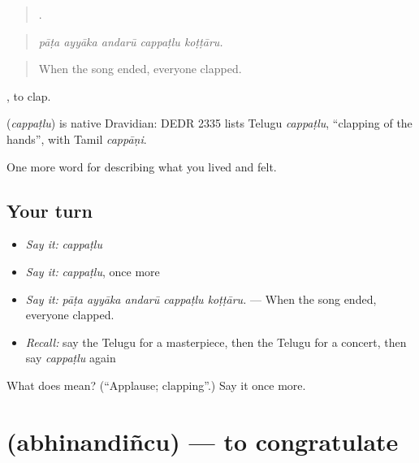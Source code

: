 \begin{quote}
    .
\end{quote}

\begin{quote}
\emph{pāṭa ayyāka andarū cappaṭlu koṭṭāru.}
\end{quote}

\begin{quote}
When the song ended, everyone clapped.
\end{quote}

 , to clap.

\begin{cousinweb}
\textbf{} (\emph{cappaṭlu}) is native Dravidian: DEDR 2335 lists Telugu \emph{cappaṭlu}, \textquotedblleft{}clapping of the hands\textquotedblright{}, with Tamil \emph{cappāṇi}.
\end{cousinweb}

\begin{grammarlens}[title={What you've built}]
One more word for describing what you lived and felt.
\end{grammarlens}

\subsection*{Your turn}
\begin{itemize}
\raggedright
  \item \emph{Say it:} \emph{cappaṭlu}
  \item \emph{Say it:} \emph{cappaṭlu}, once more
  \item \emph{Say it:} \emph{pāṭa ayyāka andarū cappaṭlu koṭṭāru.} — When the song ended, everyone clapped.
  \item \emph{Recall:} say the Telugu for a masterpiece, then the Telugu for a concert, then say \emph{cappaṭlu} again
\end{itemize}

\begin{tcolorbox}[breakable,colback=teal!4,colframe=teal!35!black,title={Before you move on}]
What does  mean? (\textquotedblleft{}Applause; clapping\textquotedblright{}.) Say it once more.
\end{tcolorbox}
\section[\texorpdfstring{\te{అభినందించు} (abhinandiñcu)}{అభినందించు (abhinandiñcu)}]{ (abhinandiñcu) — to congratulate}

